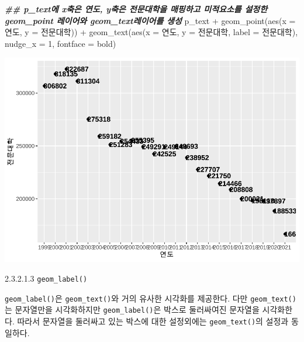 \documentclass[
]{article}
\newenvironment{Shaded}{\begin{snugshade}}{\end{snugshade}}
\newcommand{\AttributeTok}[1]{\textcolor[rgb]{0.77,0.63,0.00}{#1}}
\newcommand{\DecValTok}[1]{\textcolor[rgb]{0.00,0.00,0.81}{#1}}
\newcommand{\DocumentationTok}[1]{\textcolor[rgb]{0.56,0.35,0.01}{\textbf{\textit{#1}}}}
\newcommand{\FunctionTok}[1]{\textcolor[rgb]{0.00,0.00,0.00}{#1}}
\newcommand{\NormalTok}[1]{#1}
\newcommand{\SpecialCharTok}[1]{\textcolor[rgb]{0.00,0.00,0.00}{#1}}
\newcommand{\StringTok}[1]{\textcolor[rgb]{0.31,0.60,0.02}{#1}}
\begin{document}
\begin{Shaded}
\begin{Highlighting}[]
\DocumentationTok{\#\#  p\_text에 x축은 연도, y축은 전문대학을 매핑하고 미적요소를 설정한 geom\_point 레이어와 geom\_text레이어를 생성}
\NormalTok{p\_text }\SpecialCharTok{+}
  \FunctionTok{geom\_point}\NormalTok{(}\FunctionTok{aes}\NormalTok{(}\AttributeTok{x =}\NormalTok{ 연도, }\AttributeTok{y =}\NormalTok{ 전문대학)) }\SpecialCharTok{+}
  \FunctionTok{geom\_text}\NormalTok{(}\FunctionTok{aes}\NormalTok{(}\AttributeTok{x =}\NormalTok{ 연도, }\AttributeTok{y =}\NormalTok{ 전문대학, }\AttributeTok{label =}\NormalTok{ 전문대학), }\AttributeTok{nudge\_x =} \DecValTok{1}\NormalTok{, }\AttributeTok{fontface =} \StringTok{\textquotesingle{}bold\textquotesingle{}}\NormalTok{)}
\end{Highlighting}
\end{Shaded}

\includegraphics{chap3_files/figure-latex/unnamed-chunk-30-2.pdf}

2.3.2.1.3 \texttt{geom\_label()}

\texttt{geom\_label()}은 \texttt{geom\_text()}와 거의 유사한 시각화를 제공한다. 다만 \texttt{geom\_text()}는 문자열만을 시각화하지만 \texttt{geom\_label()}은 박스로 둘러싸여진 문자열을 시각화한다. 따라서 문자열을 둘러싸고 있는 박스에 대한 설정외에는 \texttt{geom\_text()}의 설정과 동일하다.
\end{document}
